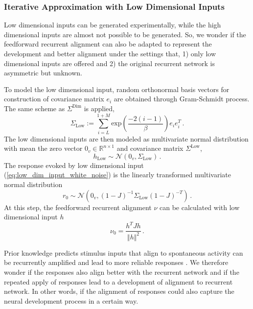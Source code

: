 \documentclass[11pt]{article}
\begin{document}
	\subsubsection{Iterative Approximation with Low Dimensional Inputs}
	Low dimensional inputs can be generated experimentally, while the high dimensional inputs are almost not possible to be generated. So, we wonder if the feedforward recurrent alignment can also be adapted to represent the development and better alignment under the settings that, 1) only low dimensional inputs are offered and 2) the original recurrent network is asymmetric but unknown.
	
	To model the low dimensional input, random orthonormal basis vectors for construction of covariance matrix $e_i$ are obtained through Gram-Schmidt process. The same scheme as $\Sigma^{\text{Dim}}$ is applied, 
		\begin{equation}
			\Sigma_{\text{Low}} := \sum_{i=L}^{1+M} \text{exp}\left(\frac{-2(i-1)}{\beta}\right) e_i e_i^T \, .
		\end{equation}
	The low dimensional inputs are then modeled as multivariate normal distribution with mean the zero vector $0_v \in \mathbb{R}^{n \times 1}$ and covariance matrix $\Sigma^{\text{Low}}$, 
		\begin{equation} \label{eq:low_dim_input_white_noise}
			h_{\text{Low}} \sim \mathcal{N}(0_v, \Sigma_{\text{Low}}) \, .
		\end{equation}
	The response evoked by low dimensional input (\ref{eq:low_dim_input_white_noise}) is the linearly transformed multivariate normal distribution
		\begin{equation}
			r_0 \sim \mathcal{N}\left( 0_v, (1-J)^{-1} \Sigma_{\text{Low}} (1-J)^{-T} \right) \, .
		\end{equation}
	At this step, the feedforward recurrent alignment $\nu$ can be calculated with low dimensional input $h$ 
		\begin{equation}
			\nu_0 = \frac{h^T J h}{\Vert h \Vert^2} \,.
		\end{equation} 
	
	Prior knowledge predicts stimulus inputs that align to spontaneous activity can be recurrently amplified and lead to more reliable responses \cite{mulholland2023selective}. 
	We therefore wonder if the responses also align better with the recurrent network and if the repeated apply of responses lead to a development of alignment to recurrent network. In other words, if the alignment of responses could also capture the neural development process in a certain way.
	
\end{document}
